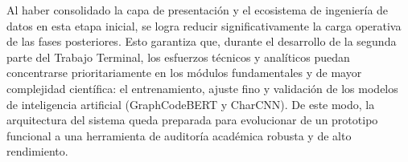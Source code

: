 Al haber consolidado la capa de presentación y el ecosistema de ingeniería de datos en esta etapa inicial, se logra reducir significativamente la carga operativa de las fases posteriores. Esto garantiza que, durante el desarrollo de la segunda parte del Trabajo Terminal, los esfuerzos técnicos y analíticos puedan concentrarse prioritariamente en los módulos fundamentales y de mayor complejidad científica: el entrenamiento, ajuste fino y validación de los modelos de inteligencia artificial (GraphCodeBERT y CharCNN). De este modo, la arquitectura del sistema queda preparada para evolucionar de un prototipo funcional a una herramienta de auditoría académica robusta y de alto rendimiento.